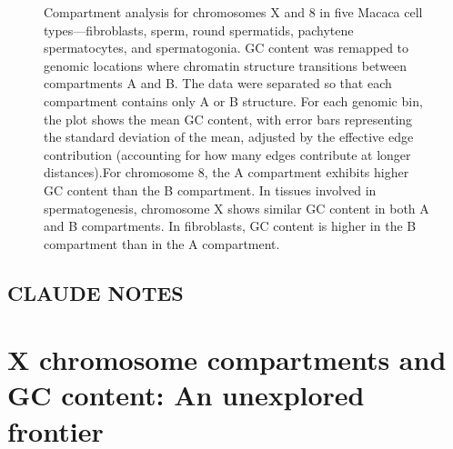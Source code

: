 \documentclass[
  a4paper,
  openany]{scrbook}
\begin{document}
\begin{figure}


\caption{\label{fig-GC}Compartment analysis for chromosomes X and 8 in
five Macaca cell types---fibroblasts, sperm, round spermatids, pachytene
spermatocytes, and spermatogonia. GC content was remapped to genomic
locations where chromatin structure transitions between compartments A
and B. The data were separated so that each compartment contains only A
or B structure. For each genomic bin, the plot shows the mean GC
content, with error bars representing the standard deviation of the
mean, adjusted by the effective edge contribution (accounting for how
many edges contribute at longer distances).For chromosome 8, the A
compartment exhibits higher GC content than the B compartment. In
tissues involved in spermatogenesis, chromosome X shows similar GC
content in both A and B compartments. In fibroblasts, GC content is
higher in the B compartment than in the A compartment.}

\end{figure}%

\subsection{CLAUDE NOTES}\label{claude-notes}

\section{X chromosome compartments and GC content: An unexplored
frontier}\label{x-chromosome-compartments-and-gc-content-an-unexplored-frontier}
\end{document}
